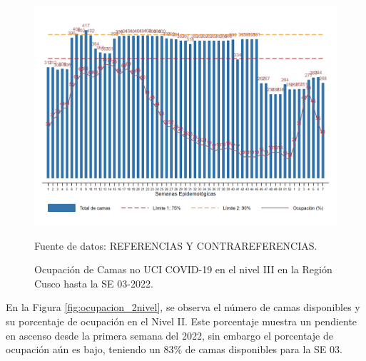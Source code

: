 \documentclass[12pt,a4paper,openany]{book}
\begin{document}
\begin{figure}[htpb]
	\caption{Ocupación de Camas no UCI COVID-19 en el nivel III en la Región Cusco hasta la SE 03-2022.}\label{fig:ocupacion_3_nivel}
	\begin{center}
		\includegraphics[width=0.95\linewidth]{../figuras/nivel_3.png}
	\end{center}
	{\footnotesize {Fuente de datos: REFERENCIAS Y CONTRAREFERENCIAS.}}
\end{figure}

\clearpage

En la Figura \ref{fig:ocupacion_2nivel}, se observa el número de camas disponibles y su porcentaje de ocupación en el Nivel II. Este porcentaje muestra un pendiente en ascenso desde la primera semana del 2022, sin embargo el porcentaje de ocupación aún es bajo, teniendo un 83$\%$ de camas disponibles para la SE 03.   
\end{document}
